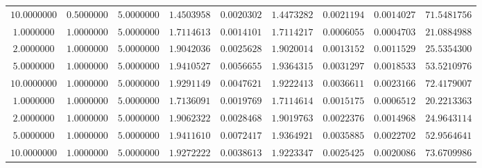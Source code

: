 \begin{tabular}{ccccccccc}
$10.0000000$ & $0.5000000$ & $5.0000000$ & $1.4503958$ & $0.0020302$ & $1.4473282$ & $0.0021194$ & $0.0014027$ & $71.5481756$\\
$1.0000000$ & $1.0000000$ & $5.0000000$ & $1.7114613$ & $0.0014101$ & $1.7114217$ & $0.0006055$ & $0.0004703$ & $21.0884988$\\
$2.0000000$ & $1.0000000$ & $5.0000000$ & $1.9042036$ & $0.0025628$ & $1.9020014$ & $0.0013152$ & $0.0011529$ & $25.5354300$\\
$5.0000000$ & $1.0000000$ & $5.0000000$ & $1.9410527$ & $0.0056655$ & $1.9364315$ & $0.0031297$ & $0.0018533$ & $53.5210976$\\
$10.0000000$ & $1.0000000$ & $5.0000000$ & $1.9291149$ & $0.0047621$ & $1.9222413$ & $0.0036611$ & $0.0023166$ & $72.4179007$\\
$1.0000000$ & $1.0000000$ & $5.0000000$ & $1.7136091$ & $0.0019769$ & $1.7114614$ & $0.0015175$ & $0.0006512$ & $20.2213363$\\
$2.0000000$ & $1.0000000$ & $5.0000000$ & $1.9062322$ & $0.0028468$ & $1.9019763$ & $0.0022376$ & $0.0014968$ & $24.9643114$\\
$5.0000000$ & $1.0000000$ & $5.0000000$ & $1.9411610$ & $0.0072417$ & $1.9364921$ & $0.0035885$ & $0.0022702$ & $52.9564641$\\
$10.0000000$ & $1.0000000$ & $5.0000000$ & $1.9272222$ & $0.0038613$ & $1.9223347$ & $0.0025425$ & $0.0020086$ & $73.6709986$\\
\end{tabular}
